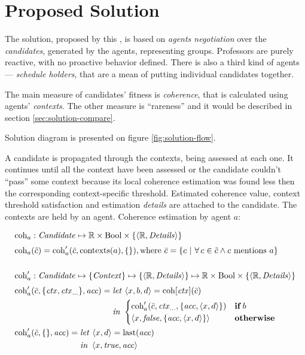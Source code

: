 \documentclass[header]{subfiles}
\begin{document}
\chapter{Proposed Solution}
\label{chapter:solution}


The solution, proposed by this \thisdoc, is based on \emph{agents negotiation}
over the \emph{candidates}, generated by the agents, representing groups.
Professors are purely reactive, with no proactive behavior defined.
There is also a third kind of agents --- \emph{schedule holders}, that are
a mean of putting individual candidates together.

The main measure of candidates' fitness is \emph{coherence}, that is calculated
using agents' \emph{contexts}. The other measure is ``rareness'' and it would be
described in section \ref{sec:solution-compare}.

Solution diagram is presented on figure \ref{fig:solution-flow}.







\medskip{}\medskip

\noindent
A candidate is propagated through the contexts, being assessed at each one.
It continues until all the context have been assessed or the candidate couldn't
``pass'' some context because its local coherence estimation was found less then
the corresponding context-specific threshold. Estimated coherence value,
context threshold satisfaction and estimation \emph{details}
are attached to the candidate. The contexts are held by an agent.
Coherence estimation by agent $a$:

\begin{align*}
  & \mathrm{coh}_a: \mathit{Candidate} \mapsto \mathbb{R} \times \mathrm{Bool} \times \{\left<\mathbb{R},\mathit{Details}\right>\}
  \\[.3em]
  & \mathrm{coh}_a(\tilde{c}) = \mathrm{coh}'_a(\bar{c}, \mathrm{contexts}(a), \{\}),
    \mathrm{where}~ \bar{c} = \{c ~|~ \forall\, c \in \tilde{c} \land
                                           c~ \mathrm{mentions}~ a \}
  \\\\
  & \mathrm{coh}'_a: \mathit{Candidate} \mapsto \{\mathit{Context}\}
             \mapsto \{\left<\mathbb{R},\mathit{Details}\right>\}
             \mapsto \mathbb{R} \times \mathrm{Bool} \times \{\left<\mathbb{R},\mathit{Details}\right>\}
  \\[.3em]
  & \mathrm{coh}'_a(\bar{c}, \{ \mathit{ctx}, \mathit{ctx}_{\dots} \}, \mathit{acc}) =
    \begin{aligned}[t] & \mathit{let}\, \left<x,b,d\right> = \mathrm{coh}[\mathit{ctx}](\bar{c}) \\& \mathit{in}~ \begin{cases}
          \mathrm{coh}'_a(\bar{c}, \mathit{ctx}_{\dots}, \{\mathit{acc}, \left<x,d\right>\}) & \mathbf{if}\, b \\
          \left<x,\mathit{false}, \{\mathit{acc}, \left<x,d\right>\}\right>          & \mathbf{otherwise}
        \end{cases} \end{aligned}\\
  & \mathrm{coh}'_a(\bar{c}, \{\}, \mathit{acc}) =
    \begin{aligned}[t] & \mathit{let}\,  \left<x,d\right> = \mathrm{last}(\mathit{acc}) \\& \mathit{in}~  \left<x,\mathit{true},\mathit{acc}\right>  \end{aligned}
\end{align*}
\end{document}
